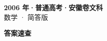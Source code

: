 \documentclass[zihao=-4, a4paper]{ctexart}
\begin{document}
\begin{center}
  {\Large\bfseries 2006 年·普通高考·安徽卷文科}\\[4pt]
  {\large 数学 · 简答版}
\end{center}
\medskip
{}

\clearpage
{}
\begin{center}{\Large\bfseries 答案速查}\end{center}
\medskip

\end{document}
